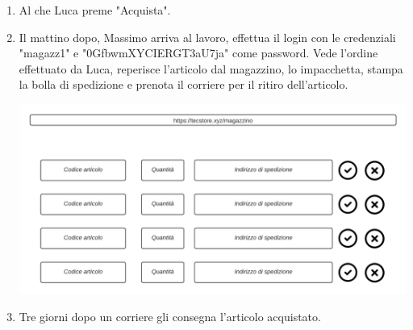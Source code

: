 \documentclass[12pt,a4paper]{article}
\begin{document}
\begin{enumerate}
\item Al che Luca preme "Acquista".

\item Il mattino dopo, Massimo arriva al lavoro, effettua il login con le credenziali "magazz1" e "0GfbwmXYCIERGT3aU7ja" come password. Vede l'ordine effettuato da Luca, reperisce l'articolo dal magazzino, lo impacchetta, stampa la bolla di spedizione e prenota il corriere per il ritiro dell'articolo.

\includegraphics[width=\textwidth]{Mockup/magazzino}

\item Tre giorni dopo un corriere gli consegna l'articolo acquistato.
\end{enumerate}

\newpage
\end{document}

